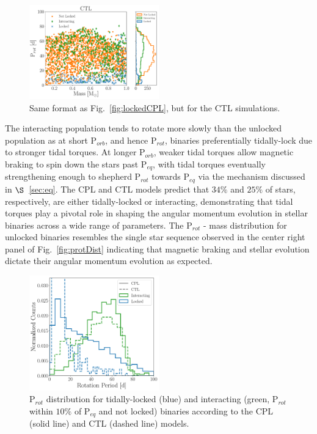 \documentclass[twocolumn]{aastex61}
\begin{document}
\begin{figure}
	\includegraphics[width=0.5\textwidth]{../Plots/lockedCTL.pdf}
   \caption{Same format as Fig.~\ref{fig:lockedCPL}, but for the CTL simulations. }%
    \label{fig:lockedCTL}%
\end{figure}

The interacting population tends to rotate more slowly than the unlocked population as at short P$_{orb}$, and hence P$_{rot}$, binaries preferentially tidally-lock due to stronger tidal torques.  At longer P$_{orb}$, weaker tidal torques allow magnetic braking to spin down the stars past P$_{eq}$, with tidal torques eventually strengthening enough to shepherd P$_{rot}$ towards P$_{eq}$ via the mechanism discussed in $\S$~\ref{sec:eq}. The CPL and CTL models predict that $34\%$ and $25\%$ of stars, respectively, are either tidally-locked or interacting, demonstrating that tidal torques play a pivotal role in shaping the angular momentum evolution in stellar binaries across a wide range of parameters. The P$_{rot}$ - mass distribution for unlocked binaries resembles the single star sequence observed in the center right panel of Fig.~\ref{fig:protDist} indicating that magnetic braking and stellar evolution dictate their angular momentum evolution as expected.

\begin{figure}
	\includegraphics[width=0.5\textwidth]{../Plots/lockedProtHist.pdf}
   \caption{P$_{rot}$ distribution for tidally-locked (blue) and interacting (green, P$_{rot}$ within $10\%$ of P$_{eq}$ and not locked) binaries according to the CPL (solid line) and CTL (dashed line) models.}%
    \label{fig:lockedProtHist}%
\end{figure}
\end{document}
